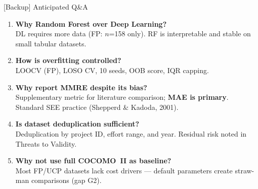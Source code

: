 \documentclass[aspectratio=169]{beamer}
\begin{document}
\begin{frame}{[Backup] Anticipated Q\&A}
\footnotesize
\begin{enumerate}
    \item \textbf{Why Random Forest over Deep Learning?}\\
    DL requires more data (FP: $n$=158 only). RF is interpretable and stable on small tabular datasets.

    \item \textbf{How is overfitting controlled?}\\
    LOOCV (FP), LOSO CV, 10 seeds, OOB score, IQR capping.

    \item \textbf{Why report MMRE despite its bias?}\\
    Supplementary metric for literature comparison; \textbf{MAE is primary}. Standard SEE practice (Shepperd \& Kadoda, 2001).

    \item \textbf{Is dataset deduplication sufficient?}\\
    Deduplication by project ID, effort range, and year. Residual risk noted in Threats to Validity.

    \item \textbf{Why not use full COCOMO~II as baseline?}\\
    Most FP/UCP datasets lack cost drivers --- default parameters create straw-man comparisons (gap G2).
\end{enumerate}
\end{frame}
\end{document}
